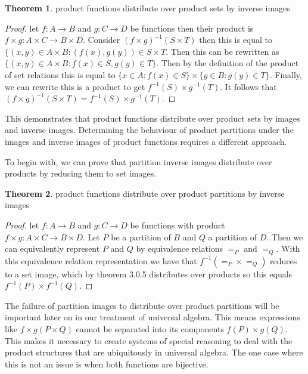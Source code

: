 \documentclass[a4paper,11pt, notitlepage]{report}
\theoremstyle{definition}
\newtheorem{theorem}{Theorem}[section]
\begin{document}
\begin{theorem} product functions distribute over product sets by inverse images
\end{theorem}

\begin{proof}
let $f: A \to B$ and $g : C \to D$ be functions then their product is $f \times g: A \times C \to B \times D$. Consider $(f \times g)^{-1}(S \times T)$ then this is equal to $\{(x,y) \in A \times B: (f(x),g(y)) \in S \times T$. Then this can be rewritten as $\{(x,y) \in A \times B : f(x) \in S, g(y) \in T\}$. Then by the definition of the product of set relations this is equal to $\{x \in A : f(x) \in S\} \times \{y \in B : g(y) \in T\}$. Finally, we can rewrite this is a product to get $f^{-1}(S) \times g^{-1}(T)$. It follows that $(f \times g)^{-1}(S \times T) = f^{-1}(S) \times g^{-1}(T)$.
\end{proof}

This demonstrates that product functions distribute over product sets by images and inverse images. Determining the behaviour of product partitions under the images and inverse images of product functions requires a different approach.

\newpage

To begin with, we can prove that partition inverse images distribute over products by reducing them to set images.

\begin{theorem} product functions distribute over product partitions by inverse images
\end{theorem}

\begin{proof} let $f: A \to B$ and $g: C \to D$ be functions with product $f \times g : A \times C \to B \times D$. Let $P$ be a partition of $B$ and $Q$ a partition of $D$. Then we can equivalently represent $P$ and $Q$ by equivalence relations $=_P$ and $=_Q$. With this equivalence relation representation we have that $f^{-1}(=_P \times =_Q)$ reduces to a set image, which by theorem 3.0.5 distributes over products so this equals $f^{-1}(P) \times f^{-1}(Q)$.
\end{proof}

The failure of partition images to distribute over product partitions will be important later on in our treatment of universal algebra. This means expressions like $f \times g(P \times Q)$ cannot be separated into its components $f(P) \times g(Q)$. This makes it necessary to create systems of special reasoning to deal with the product structures that are ubiquitously in universal algebra. The one case where this is not an issue is when both functions are bijective.
\end{document}

